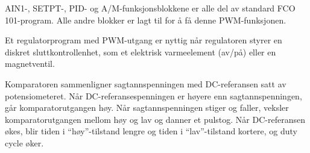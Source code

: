 












AIN1-, SETPT-, PID- og A/M-funksjonsblokkene er alle del av standard FCO 101-program. Alle andre blokker er lagt til for å få denne PWM-funksjonen.

\vskip 10pt

Et regulatorprogram med PWM-utgang er nyttig når regulatoren styrer en diskret sluttkontrollenhet, som et elektrisk varmeelement (av/på) eller en magnetventil.

\vskip 10pt

Komparatoren sammenligner sagtannspenningen med DC-referansen satt av potensiometeret. Når DC-referansespenningen er høyere enn sagtannspenningen, går komparatorutgangen høy. Når sagtannspenningen stiger og faller, veksler komparatorutgangen mellom høy og lav og danner et pulstog. Når DC-referansen økes, blir tiden i ``høy''-tilstand lengre og tiden i ``lav''-tilstand kortere, og duty cycle øker.


